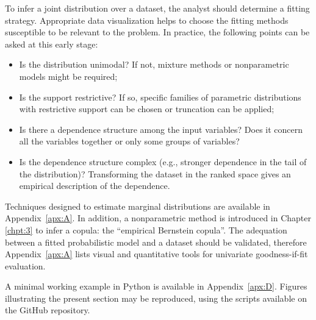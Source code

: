 To infer a joint distribution over a dataset, the analyst should determine a fitting strategy. 
Appropriate data visualization helps to choose the fitting methods susceptible to be relevant to the problem. 
In practice, the following points can be asked at this early stage:
\begin{itemize}
    \item Is the distribution unimodal? If not, mixture methods or nonparametric models might be required;
    \item Is the support restrictive? If so, specific families of parametric distributions with restrictive support can be chosen or truncation can be applied;
    \item Is there a dependence structure among the input variables? Does it concern all the variables together or only some groups of variables? 
    \item Is the dependence structure complex (e.g., stronger dependence in the tail of the distribution)? Transforming the dataset in the ranked space gives an empirical description of the dependence. 
\end{itemize} 

Techniques designed to estimate marginal distributions are available in Appendix~\ref{apx:A}. 
In addition, a nonparametric method is introduced in Chapter \ref{chpt:3} to infer a copula: the ``empirical Bernstein copula''. 
The adequation between a fitted probabilistic model and a dataset should be validated, therefore Appendix~\ref{apx:A} lists visual and quantitative tools for univariate goodness-if-fit evaluation.


\begin{otexample}
    A minimal working example in Python is available in Appendix~\ref{apx:D}. 
    Figures illustrating the present section may be reproduced, using the \ots scripts available on the GitHub repository\footnotemark. 
\end{otexample}

